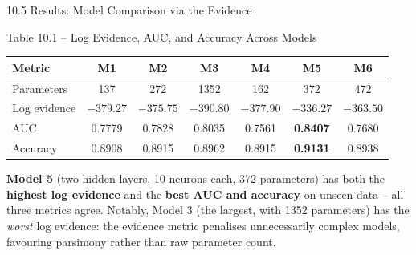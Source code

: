 \documentclass[aspectratio=169,10pt]{beamer}
\begin{document}
\begin{frame}[allowframebreaks]{10.5 Results: Model Comparison via the Evidence}

  \begin{block}{Table 10.1 -- Log Evidence, AUC, and Accuracy Across Models}
    \begin{center}
    {\scriptsize
    \begin{tabular}{lcccccc}
      \toprule
      \textbf{Metric} & \textbf{M1} & \textbf{M2} & \textbf{M3} & \textbf{M4} & \textbf{M5} & \textbf{M6} \\
      \midrule
      Parameters   & 137 & 272 & 1352 & 162 & 372 & 472 \\
      Log evidence & $-379.27$ & $-375.75$ & $-390.80$ & $-377.90$ & $\mathbf{-336.27}$ & $-363.50$ \\
      AUC          & 0.7779 & 0.7828 & 0.8035 & 0.7561 & \textbf{0.8407} & 0.7680 \\
      Accuracy     & 0.8908 & 0.8915 & 0.8962 & 0.8915 & \textbf{0.9131} & 0.8938 \\
      \bottomrule
    \end{tabular}
    }
    \end{center}
    \textbf{Model 5} (two hidden layers, 10 neurons each, 372 parameters)
    has both the \textbf{highest log evidence} and the \textbf{best AUC and
    accuracy} on unseen data -- all three metrics agree. Notably, Model 3
    (the largest, with 1352 parameters) has the \emph{worst} log evidence:
    the evidence metric penalises unnecessarily complex models, favouring
    parsimony rather than raw parameter count.
  \end{block}

  \framebreak


\end{frame}
\end{document}
